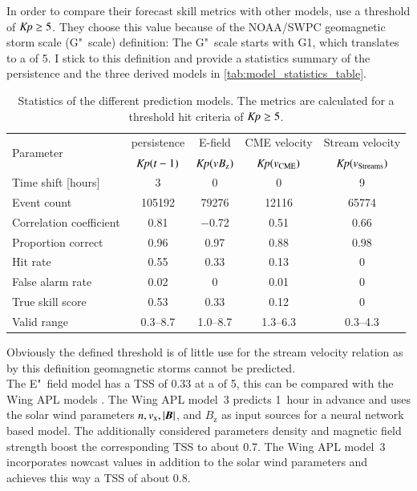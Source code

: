 {%
In order to compare their \Kp{} forecast skill metrics with other models, \citet{Savani2017} use a threshold of $\textit{Kp}{} \geq 5$. They choose this value because of the NOAA/SWPC geomagnetic storm scale (G"~scale) definition: The G"~scale starts with G1, which translates to a \Kp{} of 5. I stick to this definition and provide a statistics summary of the \Kp{} persistence and the three derived models in \autoref{tab:model_statistics_table}.
\begin{table}[htb]
	\caption{Statistics of the different prediction models. The metrics are calculated for a threshold hit criteria of $\textit{Kp}{} \geq 5$.}
	\label{tab:model_statistics_table}
	\centering
	\begin{tabular}{lcccc}
		\hline\hline
		\multirow{2}{*}{Parameter}	&\Kp{} persistence	&E-field	&CME velocity 	&Stream velocity\\
			&$\textit{Kp}(t-1)$	&$\textit{Kp}(\text{$vB_\text{z}$})$	&$\textit{Kp}(v_\text{CME})$	&$\textit{Kp}(v_\text{Streams})$\\
		\hline
		Time shift [hours]	&3	&0	&0	&9\\
		Event count	&\num{105192}	&\num{79276}	&\num{12116}	&\num{65774}\\
		Correlation coefficient	&0.81	&\num{-0.72}	&0.51	&0.66\\
		\hline
		Proportion correct	&0.96	&0.97	&0.88	&0.98\\
		Hit rate	&0.55	&0.33	&0.13	&0\\
		False alarm rate	&0.02	&0	&0.01	&0\\
		True skill score	&0.53	&0.33	&0.12	&0\\
		Valid \Kp{} range	&\numrange{0.3}{8.7}	&\numrange{1.0}{8.7}	&\numrange{1.3}{6.3}	&\numrange{0.3}{4.3}\\
		\hline
	\end{tabular}
\end{table}
Obviously the defined \Kp{} threshold is of little use for the stream velocity relation as by this definition geomagnetic storms cannot be predicted.\\

The E"~field model has a TSS of 0.33 at a \Kp{} of 5, this can be compared with the Wing APL models \citep[Fig.~13]{Wing2005}. The Wing APL model~3 predicts \Kp{} 1~hour in advance and uses the solar wind parameters $n, v_\text{x}, |\boldsymbol{B}|$, and $B_\text{z}$ as input sources for a neural network based model. The additionally considered parameters density and magnetic field strength boost the corresponding TSS to about 0.7. The Wing APL model~3 incorporates \Kp{} nowcast values in addition to the solar wind parameters and achieves this way a TSS of about 0.8.\\

}
